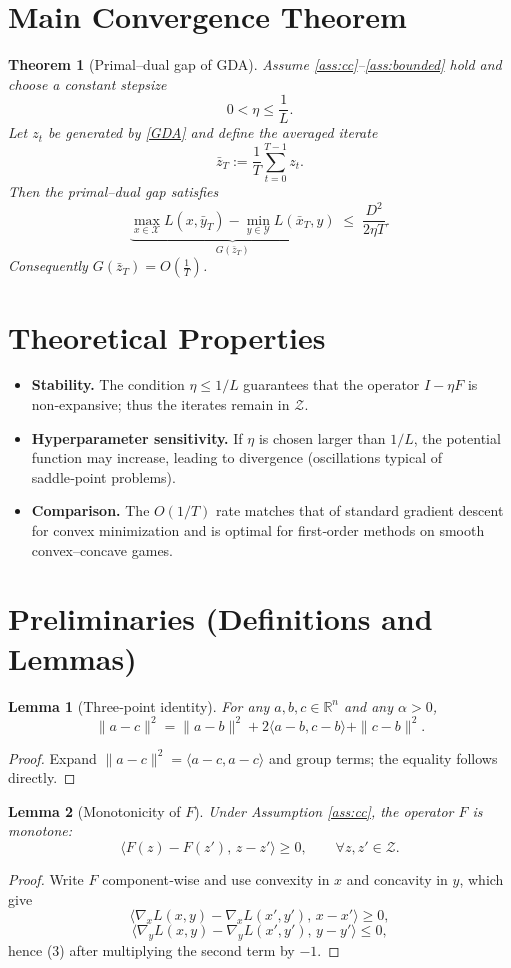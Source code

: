 \documentclass{article}
\newtheorem{theorem}{Theorem}
\newtheorem{lemma}{Lemma}
\newcommand{\grad}{\nabla}
\newcommand{\R}{\mathbb{R}}
\begin{document}
\section*{Main Convergence Theorem}
\begin{theorem}[Primal–dual gap of GDA]\label{thm:main}
Assume \ref{ass:cc}–\ref{ass:bounded} hold and choose a constant stepsize
\[
0<\eta\le \frac{1}{L}.
\]
Let $z_{t}$ be generated by \eqref{GDA} and define the averaged iterate
\[
\bar z_{T}:=\frac{1}{T}\sum_{t=0}^{T-1}z_{t}.
\]
Then the primal–dual gap satisfies
\[
\underbrace{\max_{x\in\mathcal{X}}L(x,\bar y_{T})-\min_{y\in\mathcal{Y}}L(\bar x_{T},y)}_{\displaystyle G(\bar z_{T})}
\;\le\; \frac{D^{2}}{2\eta T}.
\tag{1}
\]
Consequently $G(\bar z_{T})=O\!\left(\tfrac{1}{T}\right)$.
\end{theorem}

\section*{Theoretical Properties}
\begin{itemize}
\item \textbf{Stability.} The condition $\eta\le 1/L$ guarantees that the operator $I-\eta F$ is non‑expansive; thus the iterates remain in $\mathcal{Z}$.
\item \textbf{Hyperparameter sensitivity.} If $\eta$ is chosen larger than $1/L$, the potential function may increase, leading to divergence (oscillations typical of saddle‑point problems).
\item \textbf{Comparison.} The $O(1/T)$ rate matches that of standard gradient descent for convex minimization and is optimal for first‑order methods on smooth convex–concave games.
\end{itemize}

\section*{Preliminaries (Definitions and Lemmas)}
\begin{lemma}[Three‑point identity]\label{lem:three}
For any $a,b,c\in\R^{n}$ and any $\alpha>0$,
\[
\|a-c\|^{2}= \|a-b\|^{2}+2\langle a-b,c-b\rangle+\|c-b\|^{2}.
\tag{2}
\]
\end{lemma}
\begin{proof}
Expand $\|a-c\|^{2}=\langle a-c,a-c\rangle$ and group terms; the equality follows directly. \qedhere
\end{proof}
\begin{lemma}[Monotonicity of $F$]\label{lem:mono}
Under Assumption \ref{ass:cc}, the operator $F$ is monotone:
\[
\langle F(z)-F(z'),\,z-z'\rangle\ge 0,\qquad\forall z,z'\in\mathcal{Z}.
\tag{3}
\]
\end{lemma}
\begin{proof}
Write $F$ component‑wise and use convexity in $x$ and concavity in $y$, which give
\[
\langle\grad_{x}L(x,y)-\grad_{x}L(x',y'),\,x-x'\rangle\ge 0,
\]
\[
\langle\grad_{y}L(x,y)-\grad_{y}L(x',y'),\,y-y'\rangle\le 0,
\]
hence (3) after multiplying the second term by $-1$. \qedhere
\end{proof}
\end{document}

